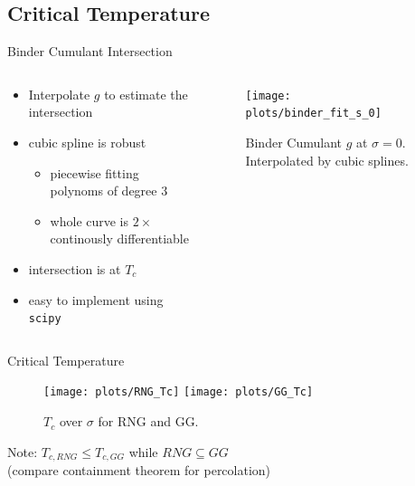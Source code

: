 \documentclass{beamer}
\begin{document}
    \subsection{Critical Temperature}
        \begin{frame}{Binder Cumulant Intersection}
            \begin{columns}[t]
                \begin{column}{5cm}
                    \begin{itemize}[<+->]
                        \item Interpolate \(g\) to estimate the intersection
                        \item cubic spline is robust
                        \begin{itemize}[<+->]
                            \item piecewise fitting polynoms of degree 3
                            \item whole curve is \(2 \times\) continously differentiable
                        \end{itemize}
                        \item intersection is at \(T_{c}\)
                        \item easy to implement using \texttt{scipy}
                    \end{itemize}
                \end{column}
                \begin{column}{6cm}
                    \begin{figure}[htbp]
                        \centering
                        \texttt{[image: plots/binder\_fit\_s\_0]}
                        \caption
                        {
                            Binder Cumulant \(g\) at \(\sigma = 0\).
                            Interpolated by cubic splines.
                        }
                        \label{fig:gettingCrit:binder_fit_s_0}
                    \end{figure}
                \end{column}
            \end{columns}
        \end{frame}

        \begin{frame}{Critical Temperature}
            \begin{figure}[htbp]
                \centering
                \subfigure
                {
                    \label{sfig:Tc:RNG}
                    \texttt{[image: plots/RNG\_Tc]}
                }
                \subfigure
                {
                    \label{sfig:Tc:GG}
                    \texttt{[image: plots/GG\_Tc]}
                }
                \caption
                {
                    \(T_c\) over \(\sigma\) for RNG and GG.
                }
                \label{fig:Tc}
            \end{figure}
            \pause
            Note: \(T_{c,RNG} \le T_{c,GG}\) while \(RNG \subseteq GG\)\\
            (compare containment theorem for percolation)
        \end{frame}
\end{document}
